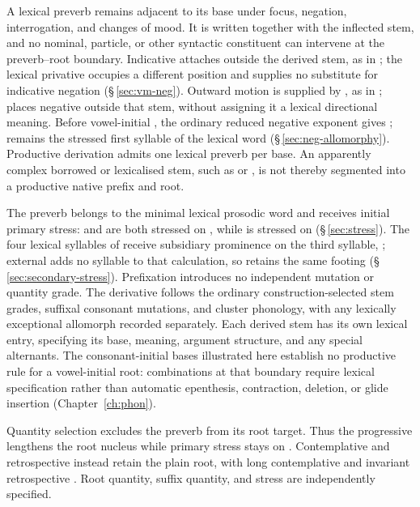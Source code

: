 A lexical preverb remains adjacent to its base under focus, negation,
interrogation, and changes of mood. It is written together with the inflected
stem, and no nominal, particle, or other syntactic constituent can intervene at the preverb--root
boundary. Indicative  attaches outside the derived stem, as in
 ; the lexical privative
 occupies a different position and supplies no substitute for
indicative negation (§\,\ref{sec:vm-neg}). Outward motion is supplied by
, as in ; 
 places negative  outside that stem,
without assigning it a lexical directional meaning. Before vowel-initial
, the ordinary reduced negative exponent gives
 ;  remains the stressed
first syllable of the lexical word (§\,\ref{sec:neg-allomorphy}). Productive
derivation admits one lexical preverb per base. An apparently complex borrowed or lexicalised stem,
such as  or , is not thereby segmented into a
productive native prefix and root.

The preverb belongs to the minimal lexical prosodic word and receives initial
primary stress:  and  are both stressed
on , while  is stressed on 
(§\,\ref{sec:stress}). The four lexical syllables of 
receive subsidiary prominence on the third syllable, ; external
 adds no syllable to that calculation, so 
retains the same footing (§\,\ref{sec:secondary-stress}). Prefixation
introduces no independent mutation or
quantity grade. The derivative follows the ordinary construction-selected
stem grades, suffixal consonant mutations, and cluster phonology, with any
lexically exceptional allomorph recorded separately. Each derived stem has its
own lexical entry, specifying its base, meaning, argument structure, and any
special alternants. The consonant-initial bases illustrated here establish no
productive rule for a vowel-initial root: combinations at that boundary require
lexical specification rather than automatic epenthesis, contraction, deletion,
or glide insertion (Chapter~\ref{ch:phon}).

Quantity selection excludes the preverb from its root target. Thus the
progressive  lengthens the root nucleus while primary stress
stays on . Contemplative  and retrospective
 instead retain the plain root, with long contemplative
 and invariant retrospective . Root quantity, suffix
quantity, and stress are independently specified.

